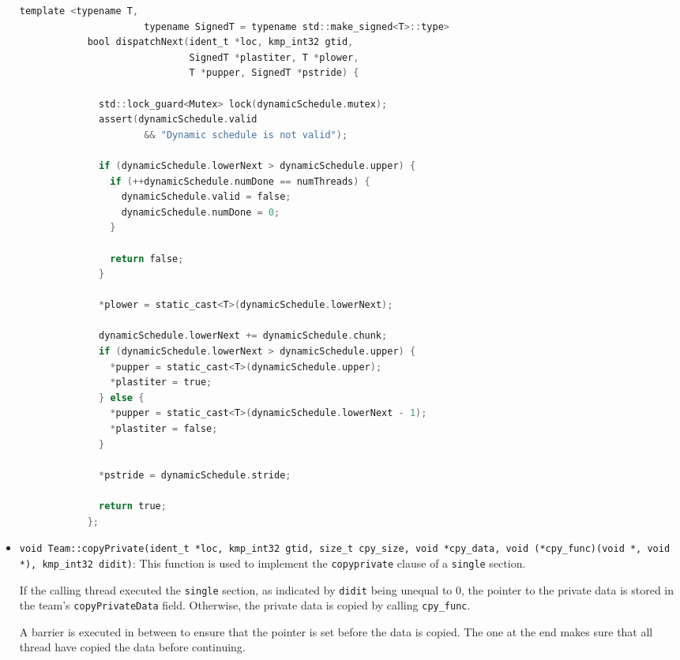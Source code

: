\begin{itemize}
	      \begin{lstlisting}[language=C, caption={void Team::dispatchNext},
          label={lst:team-dispatchnext}, escapechar=@]
            template <typename T,
                      typename SignedT = typename std::make_signed<T>::type>
            bool dispatchNext(ident_t *loc, kmp_int32 gtid,
                              SignedT *plastiter, T *plower,
                              T *pupper, SignedT *pstride) {

              std::lock_guard<Mutex> lock(dynamicSchedule.mutex);
              assert(dynamicSchedule.valid
                      && "Dynamic schedule is not valid");

              if (dynamicSchedule.lowerNext > dynamicSchedule.upper) {
                if (++dynamicSchedule.numDone == numThreads) {
                  dynamicSchedule.valid = false;
                  dynamicSchedule.numDone = 0;
                }

                return false;
              }

              *plower = static_cast<T>(dynamicSchedule.lowerNext);

              dynamicSchedule.lowerNext += dynamicSchedule.chunk;
              if (dynamicSchedule.lowerNext > dynamicSchedule.upper) {
                *pupper = static_cast<T>(dynamicSchedule.upper);
                *plastiter = true;
              } else {
                *pupper = static_cast<T>(dynamicSchedule.lowerNext - 1);
                *plastiter = false;
              }

              *pstride = dynamicSchedule.stride;

              return true;
            };
          \end{lstlisting}

	\item \texttt{void Team::copyPrivate(ident_t *loc, kmp_int32 gtid, size_t cpy_size, void
		      *cpy_data, void (*cpy_func)(void *, void *), kmp_int32 didit)}:
	      \label{subsec:team-copyprivate} This function is used to
	      implement the \texttt{copyprivate} clause of a  \texttt{single} section.

	      If the calling thread executed the \texttt{single} section, as indicated by \texttt{didit}
	      being unequal to 0, the pointer to the private data is stored in the team's \texttt{copyPrivateData}
	      field. Otherwise, the private data is copied by calling \texttt{cpy\_func}.

	      A barrier is executed in between to ensure that the pointer is set before the data is
	      copied. The one at the end makes sure that all thread have copied the data before
	      continuing.


\end{itemize}
